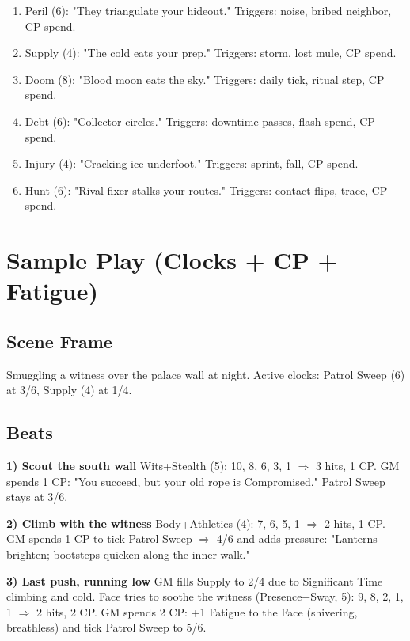 \begin{enumerate}
\item Peril (6): "They triangulate your hideout." Triggers: noise, bribed neighbor, CP spend.
\item Supply (4): "The cold eats your prep." Triggers: storm, lost mule, CP spend.
\item Doom (8): "Blood moon eats the sky." Triggers: daily tick, ritual step, CP spend.
\item Debt (6): "Collector circles." Triggers: downtime passes, flash spend, CP spend.
\item Injury (4): "Cracking ice underfoot." Triggers: sprint, fall, CP spend.
\item Hunt (6): "Rival fixer stalks your routes." Triggers: contact flips, trace, CP spend.
\end{enumerate}

\section{Sample Play (Clocks + CP + Fatigue)}

\subsection{Scene Frame}
Smuggling a witness over the palace wall at night. Active clocks: Patrol Sweep (6) at 3/6, Supply (4) at 1/4.

\subsection{Beats}

\textbf{1) Scout the south wall} Wits+Stealth (5): 10, 8, 6, 3, 1 $\Rightarrow$ 3 hits, 1 CP. GM spends 1 CP: "You succeed, but your old rope is Compromised." Patrol Sweep stays at 3/6.

\textbf{2) Climb with the witness} Body+Athletics (4): 7, 6, 5, 1 $\Rightarrow$ 2 hits, 1 CP. GM spends 1 CP to tick Patrol Sweep $\Rightarrow$ 4/6 and adds pressure: "Lanterns brighten; bootsteps quicken along the inner walk."

\textbf{3) Last push, running low} GM fills Supply to 2/4 due to Significant Time climbing and cold. Face tries to soothe the witness (Presence+Sway, 5): 9, 8, 2, 1, 1 $\Rightarrow$ 2 hits, 2 CP. GM spends 2 CP: +1 Fatigue to the Face (shivering, breathless) and tick Patrol Sweep to 5/6.

